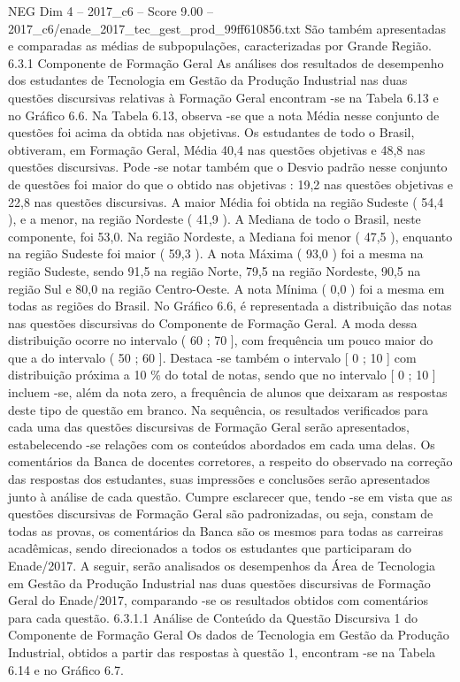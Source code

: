 \begin{textsample}{NEG Dim 4 – 2017\_c6 – Score 9.00 – 2017\_c6/enade\_2017\_tec\_gest\_prod\_99ff610856.txt}
São também apresentadas e comparadas as médias de subpopulações, caracterizadas por Grande Região. 6.3.1 Componente de Formação Geral As análises dos resultados de desempenho dos estudantes de Tecnologia em Gestão da Produção Industrial nas duas questões discursivas relativas à Formação Geral encontram -se na Tabela 6.13 e no Gráfico 6.6.
Na Tabela 6.13, observa -se que a nota Média nesse conjunto de questões foi acima da obtida nas objetivas.
Os estudantes de todo o Brasil, obtiveram, em Formação Geral, Média 40,4 nas questões objetivas e 48,8 nas questões discursivas.
Pode -se notar também que o Desvio padrão nesse conjunto de questões foi maior do que o obtido nas objetivas : 19,2 nas questões objetivas e 22,8 nas questões discursivas.
A maior Média foi obtida na região Sudeste ( 54,4 ), e a menor, na região Nordeste ( 41,9 ).
A Mediana de todo o Brasil, neste componente, foi 53,0.
Na região Nordeste, a Mediana foi menor ( 47,5 ), enquanto na região Sudeste foi maior ( 59,3 ).
A nota Máxima ( 93,0 ) foi a mesma na região Sudeste, sendo 91,5 na região Norte, 79,5 na região Nordeste, 90,5 na região Sul e 80,0 na região Centro-Oeste.
A nota Mínima ( 0,0 ) foi a mesma em todas as regiões do Brasil.
No Gráfico 6.6, é representada a distribuição das notas nas questões discursivas do Componente de Formação Geral.
A moda dessa distribuição ocorre no intervalo ( 60 ; 70 ], com frequência um pouco maior do que a do intervalo ( 50 ; 60 ].
Destaca -se também o intervalo [ 0 ; 10 ] com distribuição próxima a 10 \% do total de notas, sendo que no intervalo [ 0 ; 10 ] incluem -se, além da nota zero, a frequência de alunos que deixaram as respostas deste tipo de questão em branco.
Na sequência, os resultados verificados para cada uma das questões discursivas de Formação Geral serão apresentados, estabelecendo -se relações com os conteúdos abordados em cada uma delas.
Os comentários da Banca de docentes corretores, a respeito do observado na correção das respostas dos estudantes, suas impressões e conclusões serão apresentados junto à análise de cada questão.
Cumpre esclarecer que, tendo -se em vista que as questões discursivas de Formação Geral são padronizadas, ou seja, constam de todas as provas, os comentários da Banca são os mesmos para todas as carreiras acadêmicas, sendo direcionados a todos os estudantes que participaram do Enade/2017.
A seguir, serão analisados os desempenhos da Área de Tecnologia em Gestão da Produção Industrial nas duas questões discursivas de Formação Geral do Enade/2017, comparando -se os resultados obtidos com comentários para cada questão. 6.3.1.1 Análise de Conteúdo da Questão Discursiva 1 do Componente de Formação Geral Os dados de Tecnologia em Gestão da Produção Industrial, obtidos a partir das respostas à questão 1, encontram -se na Tabela 6.14 e no Gráfico 6.7.

\end{textsample}
